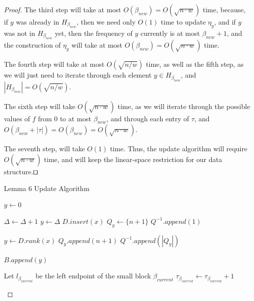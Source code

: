 \documentclass[runningheads]{llncs}
\begin{document}
\begin{proof}
    The third step will take at most $O(\beta_{new})=O(\sqrt{n\cdot w})$ time, because, if $y$ was already in $H_{\beta_{new}}$, then we need only $O(1)$ 
    time to update $\eta_y$, and if $y$ was not in $H_{\beta_{new}}$ yet, then the frequency of $y$ currently is at most $\beta_{new}+1$, and the construction of 
    $\eta_{y}$ will take at most $O(\beta_{new})=O(\sqrt{n\cdot w})$ time.

    The fourth step will take at most $O(\sqrt{n/w})$ time, as well as the fifth step, as we will just need to iterate through each element $y\in H_{\beta_{new}}$, 
    and $|H_{\beta_{new}}|=O(\sqrt{n/w})$.

    The sixth step will take $O(\sqrt{n\cdot w})$ time, as we will iterate through the possible values of $f$ from $0$ to at most $\beta_{new}$, 
    and through each entry of $\tau$, and $O(\beta_{new}+|\tau|)=O(\beta_{new})=O(\sqrt{n\cdot w})$.
    
    The seventh step, will take $O(1)$ time. Thus, the update algorithm will require $O(\sqrt{n\cdot w})$ time, 
    and will keep the linear-space restriction for our data structure.$\qed$



    \begin{algorithm}[H]
        \caption{Lemma 6 Update Algorithm}\label{lemma6Update}
        \begin{algorithmic}[1]

        
        
        \State $y\gets 0$

        
        \State $\Delta\gets \Delta+1$
        \State $y\gets \Delta$
        \State $D.insert(x)$
        \State $Q_{y}\gets \{n+1\}$
        \State $Q^{-1}.append(1)$

        \Else{}
        
        \State $y \gets D.rank(x)$
        \State $Q_{y}.append(n+1)$
        \State $Q^{-1}.append(|Q_{y}|)$

        \EndIf

        \State $B.append(y)$
        
            \State Let $l_{\beta_{current}}$ be the left endpoint of the small block $\beta_{current}$ 
                \State $\tau_{\beta_{current}}\gets \tau_{\beta_{current}}+1$
            \EndIf
        \EndFor


\end{algorithmic}
\end{algorithm}
\end{proof}
\end{document}
